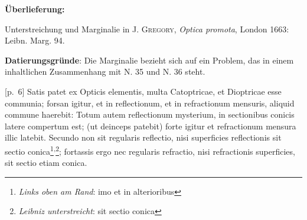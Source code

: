       
               
                \begin{ledgroupsized}[r]{120mm}
                \footnotesize 
                \pstart                
                \noindent\textbf{\"{U}berlieferung:}   
                \pend
                \end{ledgroupsized}
            
              
                            \begin{ledgroupsized}[r]{114mm}
                            \footnotesize 
                            \pstart \parindent -6mm
                            Unterstreichung und Marginalie in \textsc{J. Gregory}, \cite{00146}\textit{Optica promota}, London 1663: Leibn. Marg. 94. \pend
                            \end{ledgroupsized}
                \vspace*{5mm}
                \begin{ledgroup}
                \footnotesize 
                \pstart
            \noindent\footnotesize{\textbf{Datierungsgr\"{u}nde}: Die Marginalie bezieht sich auf ein Problem, das in einem inhaltlichen Zusammenhang mit N. 35 und N. 36 steht.}
                \pend
                \end{ledgroup}
            
                \vspace*{8mm}
                \pstart 
                \normalsize
            [p.~6] Satis patet ex Opticis elementis, multa Catoptricae, et Dioptricae esse communia; forsan igitur, et in reflectionum\protect{}, et in refractionum\protect{} mensuris, aliquid commune haerebit: Totum autem reflectionum\protect{} mysterium, in sectionibus conicis latere compertum est; (ut deinceps patebit) forte igitur et refractionum\protect{} mensura illic latebit. Secundo non sit regularis reflectio\protect{}, nisi superficies reflectionis\protect{} sit sectio conica\footnote{\textit{Links oben am Rand}: imo et in alterioribus}\textsuperscript{,}\footnote{\textit{Leibniz unterstreicht}: sit sectio conica}; fortassis ergo nec regularis refractio\protect{}, nisi refractionis\protect{} superficies, sit sectio etiam conica.\pend 
